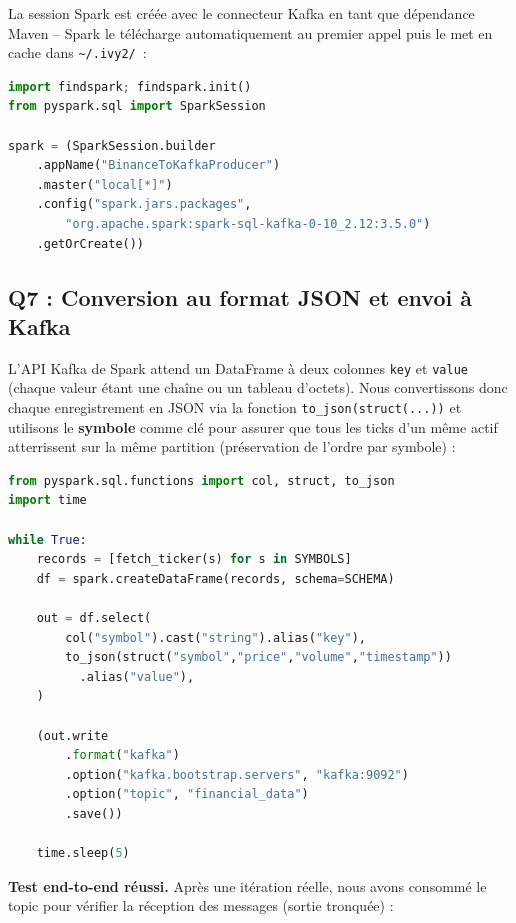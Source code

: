 \documentclass{RapportINPTCLOUD}
\begin{document}
La session Spark est cr\'{e}\'{e}e avec le connecteur Kafka en tant que d\'{e}pendance Maven -- Spark le t\'{e}l\'{e}charge automatiquement au premier appel puis le met en cache dans \texttt{\~{}/.ivy2/}~:

\begin{lstlisting}[style=code, language=Python]
import findspark; findspark.init()
from pyspark.sql import SparkSession

spark = (SparkSession.builder
    .appName("BinanceToKafkaProducer")
    .master("local[*]")
    .config("spark.jars.packages",
        "org.apache.spark:spark-sql-kafka-0-10_2.12:3.5.0")
    .getOrCreate())
\end{lstlisting}

\subsection{Q7 : Conversion au format JSON et envoi \`{a} Kafka}

L'API Kafka de Spark attend un DataFrame \`{a} deux colonnes \texttt{key} et \texttt{value} (chaque valeur \'{e}tant une cha\^{i}ne ou un tableau d'octets). Nous convertissons donc chaque enregistrement en JSON via la fonction \texttt{to\_json(struct(...))} et utilisons le \textbf{symbole} comme cl\'{e} pour assurer que tous les ticks d'un m\^{e}me actif atterrissent sur la m\^{e}me partition (pr\'{e}servation de l'ordre par symbole) :

\begin{lstlisting}[style=code, language=Python, caption=Boucle de polling et envoi \`{a} Kafka]
from pyspark.sql.functions import col, struct, to_json
import time

while True:
    records = [fetch_ticker(s) for s in SYMBOLS]
    df = spark.createDataFrame(records, schema=SCHEMA)

    out = df.select(
        col("symbol").cast("string").alias("key"),
        to_json(struct("symbol","price","volume","timestamp"))
          .alias("value"),
    )

    (out.write
        .format("kafka")
        .option("kafka.bootstrap.servers", "kafka:9092")
        .option("topic", "financial_data")
        .save())

    time.sleep(5)
\end{lstlisting}

\textbf{Test end-to-end r\'{e}ussi.} Apr\`{e}s une it\'{e}ration r\'{e}elle, nous avons consomm\'{e} le topic pour v\'{e}rifier la r\'{e}ception des messages (sortie tronqu\'{e}e) :
\end{document}
